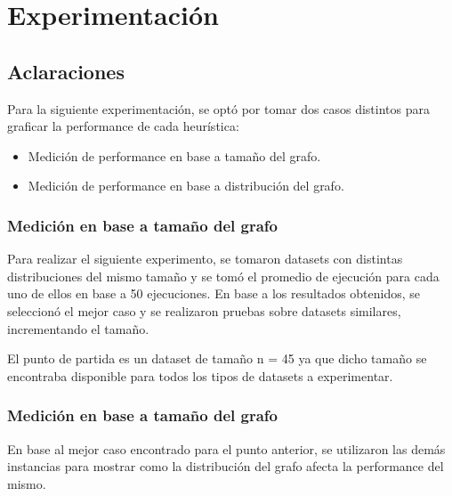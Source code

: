 \section{Experimentación}

\subsection{Aclaraciones}

Para la siguiente experimentación, se optó por tomar dos casos distintos para graficar la performance de cada heurística:

\begin{itemize}
\item Medición de performance en base a tamaño del grafo.
\item Medición de performance en base a distribución del grafo.
\end{itemize}

\subsubsection{Medición en base a tamaño del grafo}
Para realizar el siguiente experimento, se tomaron datasets con distintas distribuciones del mismo tamaño y se tomó el promedio de ejecución para cada uno de ellos en base a 50 ejecuciones. En base a los resultados obtenidos, se seleccionó el mejor caso y se realizaron pruebas sobre datasets similares, incrementando el tamaño.

\vskip 8pt

El punto de partida es un dataset de tamaño n = 45 ya que dicho tamaño se encontraba disponible para todos los tipos de datasets a experimentar.

\subsubsection{Medición en base a tamaño del grafo}
En base al mejor caso encontrado para el punto anterior, se utilizaron las demás instancias para mostrar como la distribución del grafo afecta la performance del mismo.


